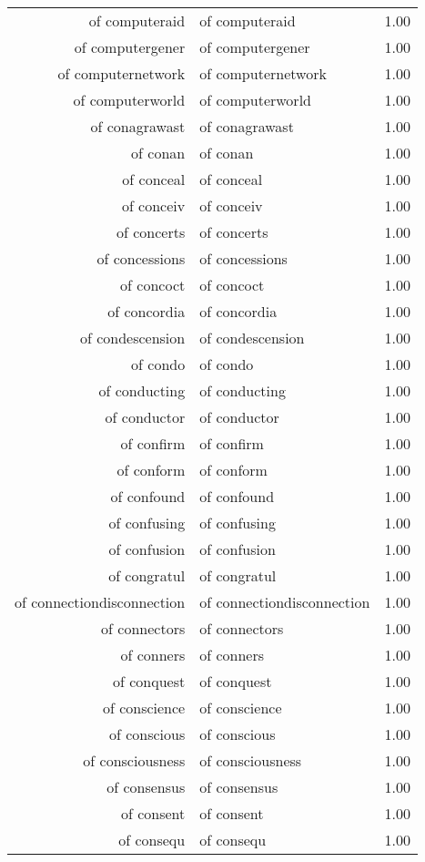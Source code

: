\begin{table}[ht]
\begin{tabular}{rlr}
  of computeraid & of computeraid & 1.00 \\ 
  of computergener & of computergener & 1.00 \\ 
  of computernetwork & of computernetwork & 1.00 \\ 
  of computerworld & of computerworld & 1.00 \\ 
  of conagrawast & of conagrawast & 1.00 \\ 
  of conan & of conan & 1.00 \\ 
  of conceal & of conceal & 1.00 \\ 
  of conceiv & of conceiv & 1.00 \\ 
  of concerts & of concerts & 1.00 \\ 
  of concessions & of concessions & 1.00 \\ 
  of concoct & of concoct & 1.00 \\ 
  of concordia & of concordia & 1.00 \\ 
  of condescension & of condescension & 1.00 \\ 
  of condo & of condo & 1.00 \\ 
  of conducting & of conducting & 1.00 \\ 
  of conductor & of conductor & 1.00 \\ 
  of confirm & of confirm & 1.00 \\ 
  of conform & of conform & 1.00 \\ 
  of confound & of confound & 1.00 \\ 
  of confusing & of confusing & 1.00 \\ 
  of confusion & of confusion & 1.00 \\ 
  of congratul & of congratul & 1.00 \\ 
  of connectiondisconnection & of connectiondisconnection & 1.00 \\ 
  of connectors & of connectors & 1.00 \\ 
  of conners & of conners & 1.00 \\ 
  of conquest & of conquest & 1.00 \\ 
  of conscience & of conscience & 1.00 \\ 
  of conscious & of conscious & 1.00 \\ 
  of consciousness & of consciousness & 1.00 \\ 
  of consensus & of consensus & 1.00 \\ 
  of consent & of consent & 1.00 \\ 
  of consequ & of consequ & 1.00 \\ 

\end{tabular}
\end{table}
